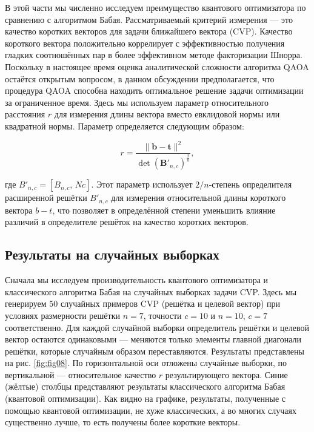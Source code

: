 
В этой части мы численно исследуем преимущество квантового оптимизатора по
сравнению с алгоритмом Бабая. Рассматриваемый критерий измерения — это качество
коротких векторов для задачи ближайшего вектора (CVP). Качество короткого
вектора положительно коррелирует с эффективностью получения гладких
соотношённых пар в более эффективном методе факторизации Шнорра. Поскольку в
настоящее время оценка аналитической сложности алгоритма QAOA остаётся открытым
вопросом, в данном обсуждении предполагается, что процедура QAOA способна
находить оптимальное решение задачи оптимизации за ограниченное время. Здесь мы
используем параметр относительного расстояния $r$ для измерения длины вектора
вместо евклидовой нормы или квадратной нормы. Параметр определяется следующим
образом:

\begin{equation}
r = \frac{\lVert \mathbf{b} - \mathbf{t} \rVert^2}{\det(\mathbf{B}'_{n,c})^{\frac{2}{n}}},
\end{equation}

где $B'_{n,c} = [B_{n,c},\, N c]$. Этот параметр использует $2/n$‑степень
определителя расширенной решётки $B'_{n,c}$ для измерения относительной длины
короткого вектора $b - t$, что позволяет в определённой степени уменьшить
влияние различий в определителе решёток на качество коротких векторов.

\subsection*{Результаты на случайных выборках}

Сначала мы исследуем производительность квантового оптимизатора и классического
алгоритма Бабая на случайных выборках задачи CVP. Здесь мы генерируем 50
случайных примеров CVP (решётка и целевой вектор) при условиях размерности
решётки $n = 7$, точности $c = 10$ и $n = 10$, $c = 7$ соответственно. Для
каждой случайной выборки определитель решётки и целевой вектор остаются
одинаковыми — меняются только элементы главной диагонали решётки, которые
случайным образом переставляются. Результаты представлены на рис.
\ref{fig:fig08}. По горизонтальной оси отложены случайные выборки, по
вертикальной — относительное качество $r$ результирующего вектора. Синие
(жёлтые) столбцы представляют результаты классического алгоритма Бабая
(квантовой оптимизации). Как видно на графике, результаты, полученные с помощью
квантовой оптимизации, не хуже классических, а во многих случаях существенно
лучше, то есть получены более короткие векторы.

